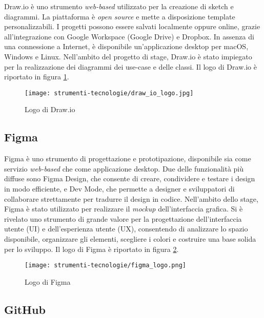 \par Draw.io è uno strumento \textit{web-based} utilizzato per la creazione di sketch e diagrammi. La piattaforma è \textit{open source} e mette a disposizione template personalizzabili. I progetti possono essere salvati localmente oppure online, grazie all’integrazione con Google Workspace (Google Drive) e Dropbox. In assenza di una connessione a Internet, è disponibile un'applicazione desktop per macOS, Windows e Linux. Nell’ambito del progetto di stage, Draw.io è stato impiegato per la realizzazione dei diagrammi dei \gls{use-case} e delle classi. Il logo di Draw.io è riportato in figura \ref{fig:logo_draw_io}.

\begin{figure}[H]
  \centering 
  \texttt{[image: strumenti-tecnologie/draw\_io\_logo.jpg]} 
  \caption{Logo di Draw.io}
  \label{fig:logo_draw_io}
\end{figure}

\subsection*{Figma}

\par Figma è uno strumento di progettazione e prototipazione, disponibile sia come servizio \textit{web-based} che come applicazione desktop. Due delle funzionalità più diffuse sono Figma Design, che consente di creare, condividere e testare i design in modo efficiente, e Dev Mode, che permette a designer e sviluppatori di collaborare strettamente per tradurre il design in codice. Nell’ambito dello stage, Figma è stato utilizzato per realizzare il \textit{mockup} dell’interfaccia grafica. Si è rivelato uno strumento di grande valore per la progettazione dell'interfaccia utente (UI) e dell’esperienza utente (UX), consentendo di analizzare lo spazio disponibile, organizzare gli elementi, scegliere i colori e costruire una base solida per lo sviluppo. Il logo di Figma è riportato in figura \ref{fig:logo_figma}.

\begin{figure}[H]
  \centering 
  \texttt{[image: strumenti-tecnologie/figma\_logo.png]} 
  \caption{Logo di Figma}
  \label{fig:logo_figma}
\end{figure}

\subsection*{GitHub}

